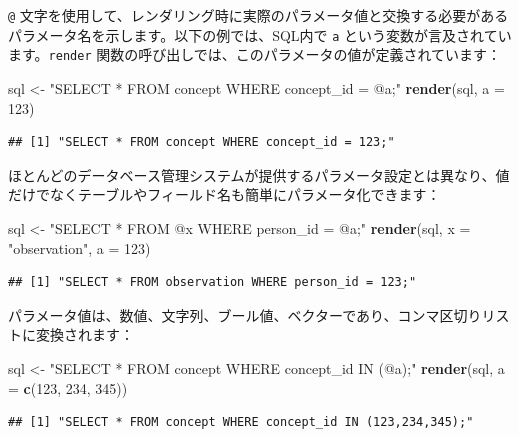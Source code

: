 \documentclass[
  11pt]{book}
\newenvironment{Shaded}{\begin{snugshade}}{\end{snugshade}}
\newcommand{\AttributeTok}[1]{\textcolor[rgb]{0.13,0.29,0.53}{#1}}
\newcommand{\DecValTok}[1]{\textcolor[rgb]{0.00,0.00,0.81}{#1}}
\newcommand{\FunctionTok}[1]{\textcolor[rgb]{0.13,0.29,0.53}{\textbf{#1}}}
\newcommand{\NormalTok}[1]{#1}
\newcommand{\OtherTok}[1]{\textcolor[rgb]{0.56,0.35,0.01}{#1}}
\newcommand{\StringTok}[1]{\textcolor[rgb]{0.31,0.60,0.02}{#1}}
\theoremstyle{definition}
\theoremstyle{definition}
\theoremstyle{definition}
\theoremstyle{definition}
\theoremstyle{remark}
\begin{document}
\texttt{@} 文字を使用して、レンダリング時に実際のパラメータ値と交換する必要があるパラメータ名を示します。以下の例では、SQL内で \texttt{a} という変数が言及されています。\texttt{render} 関数の呼び出しでは、このパラメータの値が定義されています：

\begin{Shaded}
\begin{Highlighting}[]
\NormalTok{sql }\OtherTok{\textless{}{-}} \StringTok{"SELECT * FROM concept WHERE concept\_id = @a;"}
\FunctionTok{render}\NormalTok{(sql, }\AttributeTok{a =} \DecValTok{123}\NormalTok{)}
\end{Highlighting}
\end{Shaded}

\begin{verbatim}
## [1] "SELECT * FROM concept WHERE concept_id = 123;"
\end{verbatim}

ほとんどのデータベース管理システムが提供するパラメータ設定とは異なり、値だけでなくテーブルやフィールド名も簡単にパラメータ化できます：

\begin{Shaded}
\begin{Highlighting}[]
\NormalTok{sql }\OtherTok{\textless{}{-}} \StringTok{"SELECT * FROM @x WHERE person\_id = @a;"}
\FunctionTok{render}\NormalTok{(sql, }\AttributeTok{x =} \StringTok{"observation"}\NormalTok{, }\AttributeTok{a =} \DecValTok{123}\NormalTok{)}
\end{Highlighting}
\end{Shaded}

\begin{verbatim}
## [1] "SELECT * FROM observation WHERE person_id = 123;"
\end{verbatim}

パラメータ値は、数値、文字列、ブール値、ベクターであり、コンマ区切りリストに変換されます：

\begin{Shaded}
\begin{Highlighting}[]
\NormalTok{sql }\OtherTok{\textless{}{-}} \StringTok{"SELECT * FROM concept WHERE concept\_id IN (@a);"}
\FunctionTok{render}\NormalTok{(sql, }\AttributeTok{a =} \FunctionTok{c}\NormalTok{(}\DecValTok{123}\NormalTok{, }\DecValTok{234}\NormalTok{, }\DecValTok{345}\NormalTok{))}
\end{Highlighting}
\end{Shaded}

\begin{verbatim}
## [1] "SELECT * FROM concept WHERE concept_id IN (123,234,345);"
\end{verbatim}
\end{document}
